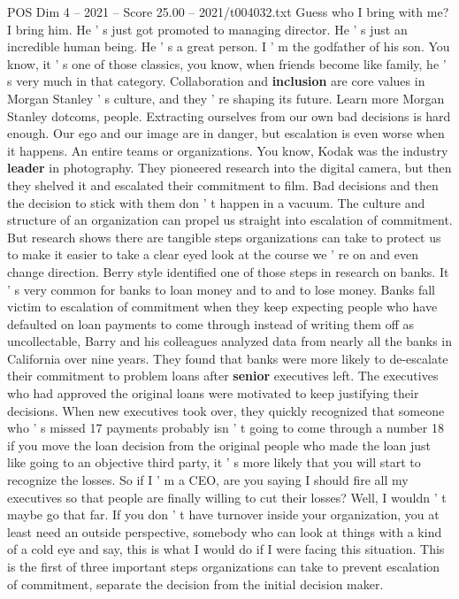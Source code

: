 \begin{textsample}{POS Dim 4 – 2021 – Score 25.00 – 2021/t004032.txt}
Guess who I bring with me?
I bring him.
He ' s just got promoted to managing director.
He ' s just an incredible human being.
He ' s a great person.
I ' m the godfather of his son.
You know, it ' s one of those classics, you know, when friends become like family, he ' s very much in that category.
Collaboration and \textbf{inclusion} are core values in Morgan Stanley ' s culture, and they ' re shaping its future.
Learn more Morgan Stanley dotcoms, people.
Extracting ourselves from our own bad decisions is hard enough.
Our ego and our image are in danger, but escalation is even worse when it happens.
An entire teams or organizations.
You know, Kodak was the industry \textbf{leader} in photography.
They pioneered research into the digital camera, but then they shelved it and escalated their commitment to film.
Bad decisions and then the decision to stick with them don ' t happen in a vacuum.
The culture and structure of an organization can propel us straight into escalation of commitment.
But research shows there are tangible steps organizations can take to protect us to make it easier to take a clear eyed look at the course we ' re on and even change direction.
Berry style identified one of those steps in research on banks.
It ' s very common for banks to loan money and to and to lose money.
Banks fall victim to escalation of commitment when they keep expecting people who have defaulted on loan payments to come through instead of writing them off as uncollectable, Barry and his colleagues analyzed data from nearly all the banks in California over nine years.
They found that banks were more likely to de-escalate their commitment to problem loans after \textbf{senior} executives left.
The executives who had approved the original loans were motivated to keep justifying their decisions.
When new executives took over, they quickly recognized that someone who ' s missed 17 payments probably isn ' t going to come through a number 18 if you move the loan decision from the original people who made the loan just like going to an objective third party, it ' s more likely that you will start to recognize the losses.
So if I ' m a CEO, are you saying I should fire all my executives so that people are finally willing to cut their losses?
Well, I wouldn ' t maybe go that far.
If you don ' t have turnover inside your organization, you at least need an outside perspective, somebody who can look at things with a kind of a cold eye and say, this is what I would do if I were facing this situation.
This is the first of three important steps organizations can take to prevent escalation of commitment, separate the decision from the initial decision maker.

\end{textsample}
